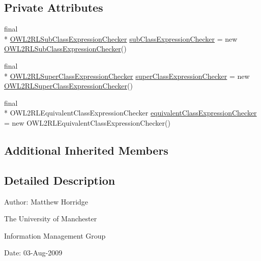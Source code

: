 \subsection*{Private Attributes}
\begin{DoxyCompactItemize}
\item 
final \\*
\hyperlink{classorg_1_1semanticweb_1_1owlapi_1_1profiles_1_1_o_w_l2_r_l_profile_1_1_o_w_l2_r_l_sub_class_expression_checker}{O\-W\-L2\-R\-L\-Sub\-Class\-Expression\-Checker} \hyperlink{classorg_1_1semanticweb_1_1owlapi_1_1profiles_1_1_o_w_l2_r_l_profile_a094973ac507ee22ba6383c5e97a9f9b5}{sub\-Class\-Expression\-Checker} = new \hyperlink{classorg_1_1semanticweb_1_1owlapi_1_1profiles_1_1_o_w_l2_r_l_profile_1_1_o_w_l2_r_l_sub_class_expression_checker}{O\-W\-L2\-R\-L\-Sub\-Class\-Expression\-Checker}()
\item 
final \\*
\hyperlink{classorg_1_1semanticweb_1_1owlapi_1_1profiles_1_1_o_w_l2_r_l_profile_1_1_o_w_l2_r_l_super_class_expression_checker}{O\-W\-L2\-R\-L\-Super\-Class\-Expression\-Checker} \hyperlink{classorg_1_1semanticweb_1_1owlapi_1_1profiles_1_1_o_w_l2_r_l_profile_a181793c61923549b4a43f3d1c05ca183}{super\-Class\-Expression\-Checker} = new \hyperlink{classorg_1_1semanticweb_1_1owlapi_1_1profiles_1_1_o_w_l2_r_l_profile_1_1_o_w_l2_r_l_super_class_expression_checker}{O\-W\-L2\-R\-L\-Super\-Class\-Expression\-Checker}()
\item 
final \\*
O\-W\-L2\-R\-L\-Equivalent\-Class\-Expression\-Checker \hyperlink{classorg_1_1semanticweb_1_1owlapi_1_1profiles_1_1_o_w_l2_r_l_profile_aa5dafb6acc0c5b75110863328a0c8d7f}{equivalent\-Class\-Expression\-Checker} = new O\-W\-L2\-R\-L\-Equivalent\-Class\-Expression\-Checker()
\end{DoxyCompactItemize}
\subsection*{Additional Inherited Members}


\subsection{Detailed Description}
Author\-: Matthew Horridge\par
 The University of Manchester\par
 Information Management Group\par
 Date\-: 03-\/\-Aug-\/2009 

